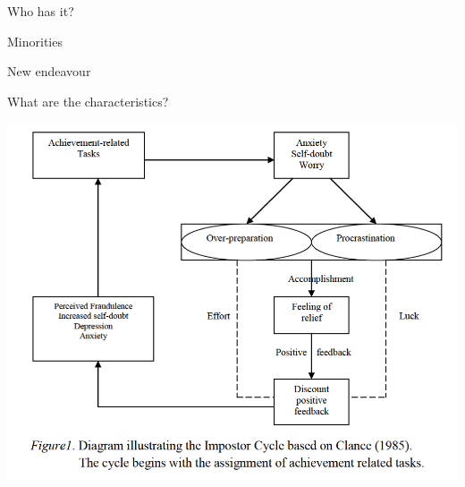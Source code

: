 \documentclass[aspectratio=169]{beamer}
\begin{document}
\begin{frame}
  \begin{center}
    \Huge Who has it?
    \\ \small \cite{clanceimes78}
  \end{center}
\end{frame}

\begin{frame}
  \begin{center}
    \Huge Minorities
    \\ \small \cite{apa13}
  \end{center}
\end{frame}

\begin{frame}
  \begin{center}
    \Huge New endeavour
    \\ \small \cite{apa13}
  \end{center}
\end{frame}

\begin{frame}
  \begin{center}
    \Huge What are the characteristics?
  \end{center}
\end{frame}

\begin{frame}
  \begin{center}
    \includegraphics[scale=.5]{./assets/clance-impostor-cycle.png}
    \\ \small \cite{sakulku11}
  \end{center}
\end{frame}
\end{document}
